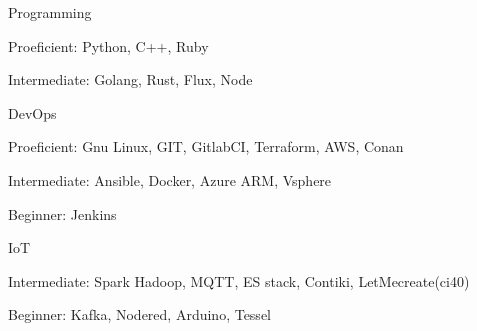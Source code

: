 

\begin{cvskills}

  \cvskill
    {Programming}
    {
      \begin{cvitems} %
        \item Proeficient:\hspace{2.5mm} Python, C++, Ruby
        \item Intermediate:              Golang, Rust, Flux, Node
      \end{cvitems}
    }
  \cvskill
    {DevOps} %
    {
      \begin{cvitems} %
        \item Proeficient:\hspace{2.5mm} Gnu Linux, GIT, GitlabCI, Terraform, AWS, Conan
        \item Intermediate:              Ansible, Docker, Azure ARM, Vsphere
        \item Beginner:\hspace{5mm}      Jenkins
      \end{cvitems}
    }

  \cvskill
    {IoT} %
    {
      \begin{cvitems} %
      \item Intermediate:             Spark Hadoop, MQTT, ES stack, Contiki, LetMecreate(ci40)
      \item Beginner:\hspace{5mm}     Kafka, Nodered, Arduino, Tessel
      \end{cvitems}
    }


\end{cvskills}
